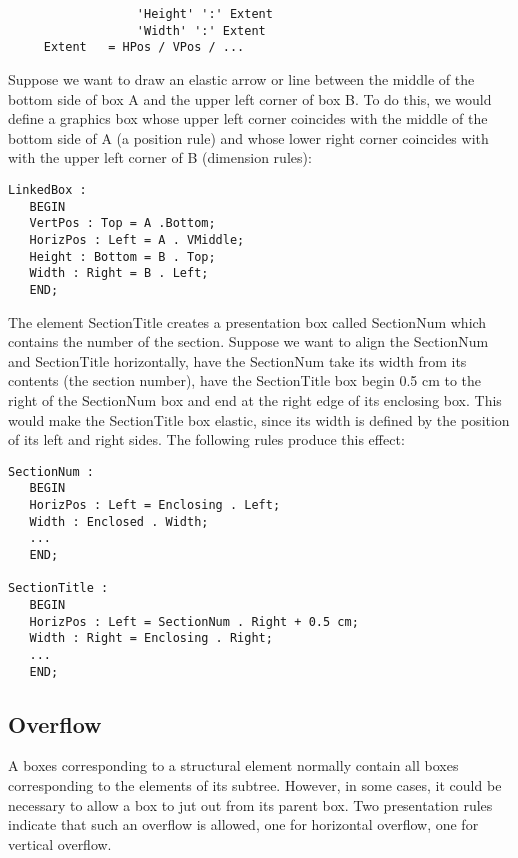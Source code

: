 \begin{verbatim}
                  'Height' ':' Extent
                  'Width' ':' Extent
     Extent   = HPos / VPos / ...
\end{verbatim}

\begin{example}
Suppose we want to draw an elastic arrow or line between the middle of
the bottom side of box A and the upper left corner of box B.  To do
this, we would define a graphics box whose upper left corner coincides
with the middle of the bottom side of A (a position rule) and whose
lower right corner coincides with with the upper left corner of B
(dimension rules):

\begin{verbatim}
LinkedBox :
   BEGIN
   VertPos : Top = A .Bottom;
   HorizPos : Left = A . VMiddle;
   Height : Bottom = B . Top;
   Width : Right = B . Left;
   END;
\end{verbatim}
\end{example}

\begin{example}
The element SectionTitle creates a presentation box called SectionNum
which contains the number of the section.  Suppose we want to align
the SectionNum and SectionTitle horizontally, have the SectionNum take
its width from its contents (the section number), have the
SectionTitle box begin 0.5 cm to the right of the SectionNum box and
end at the right edge of its enclosing box.  This would make the
SectionTitle box elastic, since its width is defined by the position
of its left and right sides.  The following rules produce this effect:

\begin{verbatim}
SectionNum :
   BEGIN
   HorizPos : Left = Enclosing . Left;
   Width : Enclosed . Width;
   ...
   END;

SectionTitle :
   BEGIN
   HorizPos : Left = SectionNum . Right + 0.5 cm;
   Width : Right = Enclosing . Right;
   ...
   END;
\end{verbatim}
\end{example}

\subsection{Overflow}

A boxes corresponding to a structural element normally contain all boxes
corresponding to the elements of its subtree.  However, in some cases,
it could be necessary to allow a box to jut out from its parent box.
Two presentation rules indicate that such an overflow is allowed, one
for horizontal overflow, one for vertical overflow.

